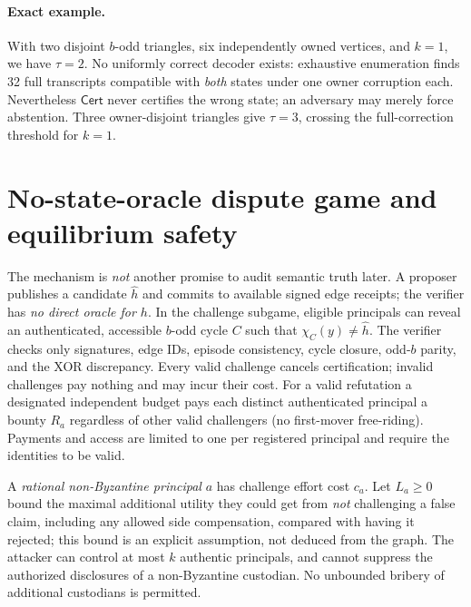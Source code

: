 \documentclass[10pt,a4paper]{article}
\newcommand{\Cert}{\mathsf{Cert}}
\begin{document}
\paragraph{Exact example.} With two disjoint $b$-odd triangles, six independently owned vertices, and $k=1$, we have $\tau=2$. No uniformly correct decoder exists: exhaustive enumeration finds 32 full transcripts compatible with \emph{both} states under one owner corruption each. Nevertheless $\Cert$ never certifies the wrong state; an adversary may merely force abstention. Three owner-disjoint triangles give $\tau=3$, crossing the full-correction threshold for $k=1$.

\section{No-state-oracle dispute game and equilibrium safety}
The mechanism is \emph{not} another promise to audit semantic truth later. A proposer publishes a candidate $\hat h$ and commits to available signed edge receipts; the verifier has \emph{no direct oracle for $h$}. In the challenge subgame, eligible principals can reveal an authenticated, accessible $b$-odd cycle $C$ such that $\chi_C(y)\ne\hat h$. The verifier checks only signatures, edge IDs, episode consistency, cycle closure, odd-$b$ parity, and the XOR discrepancy. Every valid challenge cancels certification; invalid challenges pay nothing and may incur their cost. For a valid refutation a designated independent budget pays each distinct authenticated principal a bounty $R_a$ regardless of other valid challengers (no first-mover free-riding). Payments and access are limited to one per registered principal and require the identities to be valid.

A \emph{rational non-Byzantine principal} $a$ has challenge effort cost $c_a$. Let $L_a\ge0$ bound the maximal additional utility they could get from \emph{not} challenging a false claim, including any allowed side compensation, compared with having it rejected; this bound is an explicit assumption, not deduced from the graph. The attacker can control at most $k$ authentic principals, and cannot suppress the authorized disclosures of a non-Byzantine custodian. No unbounded bribery of additional custodians is permitted.
\end{document}
